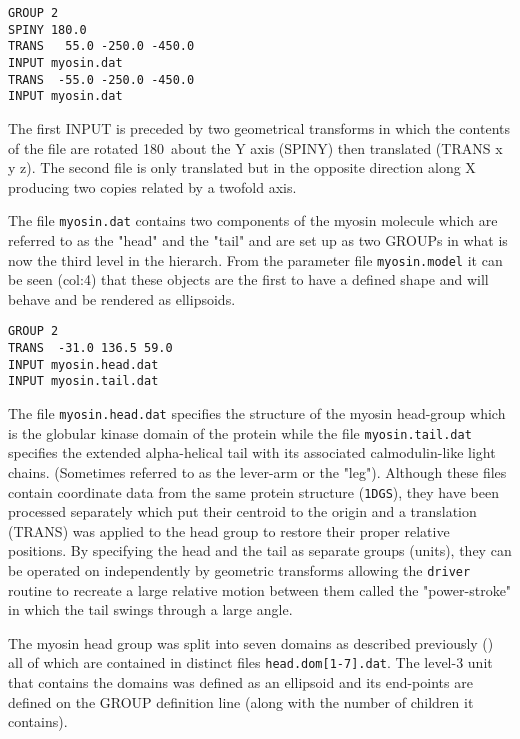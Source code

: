 \begin{singlespace}
\begin{verbatim}
GROUP 2
SPINY 180.0
TRANS   55.0 -250.0 -450.0
INPUT myosin.dat
TRANS  -55.0 -250.0 -450.0
INPUT myosin.dat
\end{verbatim}
\end{singlespace}

The first INPUT is preceded by two geometrical transforms in which the contents
of the file are rotated 180\degre\ about the Y axis (SPINY) then translated 
(TRANS x y z).  The second file is only translated but in the opposite direction
along X producing two copies related by a twofold axis.

The file {\tt myosin.dat} contains two components of the myosin molecule which 
are referred to as the "head" and the "tail" and are set up as two GROUPs in what
is now the third level in the hierarch.   From the parameter file {\tt myosin.model}
it can be seen (col:4) that these objects are the first to have a defined shape
and will behave and be rendered as ellipsoids.

\begin{singlespace}
\begin{verbatim}
GROUP 2
TRANS  -31.0 136.5 59.0
INPUT myosin.head.dat
INPUT myosin.tail.dat
\end{verbatim}
\end{singlespace}

The file {\tt myosin.head.dat} specifies the structure of the myosin head-group 
which is the globular kinase domain of the protein while the file {\tt myosin.tail.dat}
specifies the extended alpha-helical tail with its associated calmodulin-like
light chains. (Sometimes referred to as the lever-arm or the "leg").   Although these
files contain coordinate data from the same protein structure ({\tt 1DGS}), they have 
been processed separately which put their centroid to the origin and a translation
(TRANS) was applied to the head group to restore their proper relative positions.
By specifying the head and the tail as separate groups (units), they can be
operated on independently by geometric transforms allowing the {\tt driver} routine
to recreate a large relative motion between them called the "power-stroke" in which
the tail swings through a large angle.

The myosin head group was split into seven domains as described previously () all of
which are contained in distinct files {\tt head.dom[1-7].dat}.  The level-3 unit that
contains the domains was defined as an ellipsoid and its end-points are defined on the
GROUP definition line (along with the number of children it contains). 

